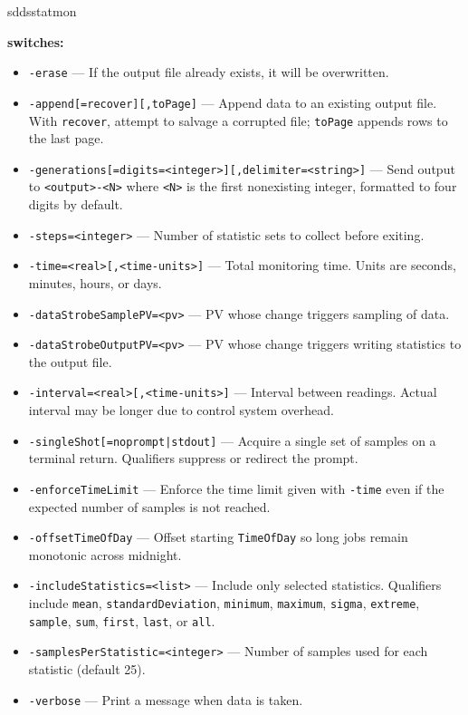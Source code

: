 \begin{sddsprog}{sddsstatmon}
\item \textbf{switches:}
    \begin{itemize}
        \item {\tt -erase} --- If the output file already exists, it will be overwritten.
        \item {\tt -append[=recover][,toPage]} --- Append data to an existing output file. With \verb+recover+, attempt to salvage a corrupted file; \verb+toPage+ appends rows to the last page.
        \item {\verb+-generations[=digits=<integer>][,delimiter=<string>]+} --- Send output to \verb+<output>-<N>+ where \verb+<N>+ is the first nonexisting integer, formatted to four digits by default.
        \item {\tt -steps=<integer>} --- Number of statistic sets to collect before exiting.
        \item {\tt -time=<real>[,<time-units>]} --- Total monitoring time. Units are seconds, minutes, hours, or days.
        \item {\tt -dataStrobeSamplePV=<pv>} --- PV whose change triggers sampling of data.
        \item {\tt -dataStrobeOutputPV=<pv>} --- PV whose change triggers writing statistics to the output file.
        \item {\tt -interval=<real>[,<time-units>]} --- Interval between readings. Actual interval may be longer due to control system overhead.
        \item {\tt -singleShot[={noprompt|stdout}]} --- Acquire a single set of samples on a terminal return. Qualifiers suppress or redirect the prompt.
        \item {\tt -enforceTimeLimit} --- Enforce the time limit given with \verb+-time+ even if the expected number of samples is not reached.
        \item {\tt -offsetTimeOfDay} --- Offset starting \verb+TimeOfDay+ so long jobs remain monotonic across midnight.
        \item {\tt -includeStatistics=<list>} --- Include only selected statistics. Qualifiers include \verb+mean+, \verb+standardDeviation+, \verb+minimum+, \verb+maximum+, \verb+sigma+, \verb+extreme+, \verb+sample+, \verb+sum+, \verb+first+, \verb+last+, or \verb+all+.
        \item {\tt -samplesPerStatistic=<integer>} --- Number of samples used for each statistic (default 25).
        \item {\tt -verbose} --- Print a message when data is taken.

\end{itemize}
\end{sddsprog}

